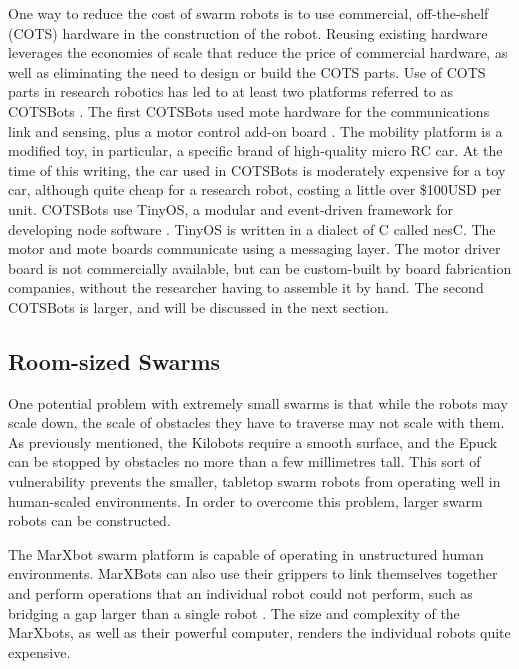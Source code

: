 One way to reduce the cost of swarm robots is to use commercial, off-the-shelf (COTS) hardware in the construction of the robot. 
Reusing existing hardware leverages the economies of scale that reduce the price of commercial hardware, as well as eliminating the need to design or build the COTS parts. 
Use of COTS parts in research robotics has led to at least two platforms referred to as COTSBots \citep{bergbreiter2003cotsbots, soule2011cotsbots}.
The first COTSBots used mote hardware for the communications link and sensing, plus a motor control add-on board \citep{bergbreiter2003cotsbots}. 
The mobility platform is a modified toy, in particular, a specific brand of high-quality micro RC car.
At the time of this writing, the car used in COTSBots is moderately expensive for a toy car, although quite cheap for a research robot, costing a little over \$100USD per unit. 
COTSBots use TinyOS, a modular and event-driven framework for developing node software \citep{levis2005tinyos}. 
TinyOS is written in a dialect of C called nesC. The motor and mote boards communicate using a messaging layer. 
The motor driver board is not commercially available, but can be custom-built by board fabrication companies, without the researcher having to assemble it by hand. 
The second COTSBots is larger, and will be discussed in the next section. 

\subsection{Room-sized Swarms}

One potential problem with extremely small swarms is that while the robots may scale down, the scale of obstacles they have to traverse may not scale with them. 
As previously mentioned, the Kilobots require a smooth surface, and the Epuck can be stopped by obstacles no more than a few millimetres tall. 
This sort of vulnerability prevents the smaller, tabletop swarm robots from operating well in human-scaled environments. 
In order to overcome this problem, larger swarm robots can be constructed.
 
The MarXbot swarm platform is capable of operating in unstructured human environments. 
MarXBots can also use their grippers to link themselves together and perform operations that an individual robot could not perform, such as bridging a gap larger than a single robot \citep{bonani2010marxbot}. 
The size and complexity of the MarXbots, as well as their powerful computer, renders the individual robots quite expensive. 

